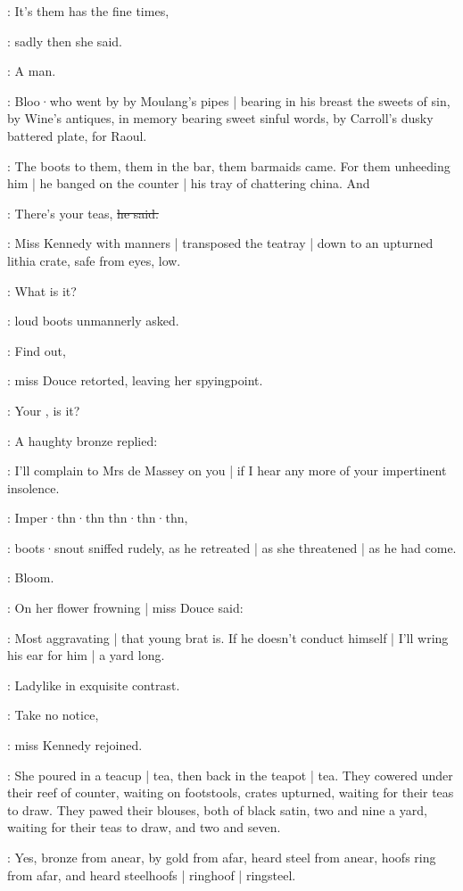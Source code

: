 \MissK:
It's them has the fine times,

:
sadly then she said.

:
A man.

:
Bloo·who went by by Moulang's pipes |
bearing in his breast the sweets of sin,
by Wine's antiques,
in memory bearing sweet sinful words,
by Carroll's dusky battered plate,
for Raoul.

:
The boots to them,
them in the bar,
them barmaids came.
For them unheeding him |
he banged on the counter |
his tray of chattering china.
And

\boots:
There's your teas,
\sout{he said.}

:
Miss Kennedy with manners |
transposed the teatray |
down to an upturned lithia crate,
safe from eyes,
low.

\boots:
What is it?

:
loud boots unmannerly asked.

\MissD:
Find out,

:
miss Douce retorted,
leaving her spyingpoint.

\boots:
Your ,
is it?

:
A haughty bronze replied:

\MissD:
I'll complain to Mrs de Massey on you |
if I hear any more of your impertinent insolence.

\boots:
Imper·thn·thn thn·thn·thn,

:
boots·snout sniffed rudely,
as he retreated |
as she threatened |
as he had come.

:
Bloom.

:
On her flower frowning |
miss Douce said:

\MissD:
Most aggravating |
that young brat is.
If he doesn't conduct himself |
I'll wring his ear for him |
a yard long.

:
Ladylike in exquisite contrast.

\MissK:
Take no notice,

:
miss Kennedy rejoined.

:
She poured in a teacup |
tea,
then back in the teapot |
tea.
They cowered under their reef of counter,
waiting on footstools,
crates upturned,
waiting for their teas to draw.
They pawed their blouses,
both of black satin,
two and nine a yard,
waiting for their teas to draw,
and two and seven.

:
Yes,
bronze from anear,
by gold from afar,
heard steel from anear,
hoofs ring from afar,
and heard steelhoofs |
ringhoof |
ringsteel.

